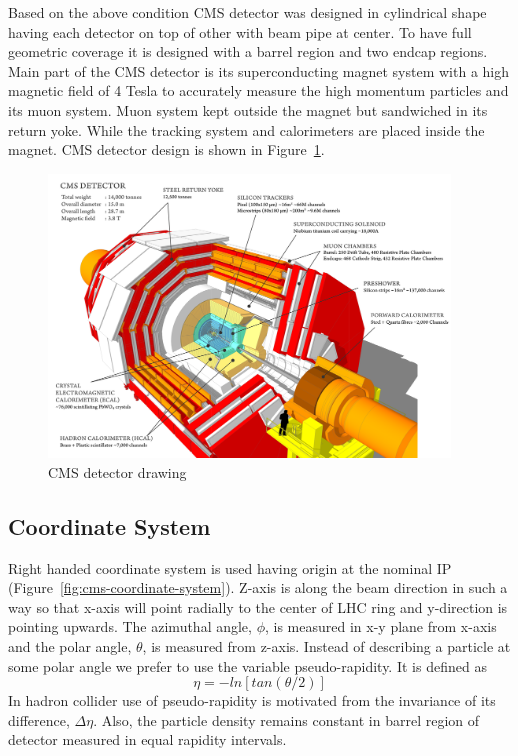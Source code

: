 Based on the above condition CMS detector was designed in cylindrical shape having each detector on top of other with beam pipe at center. To have full geometric coverage it is designed with a barrel region and two endcap regions. Main part of the CMS detector is its superconducting magnet system with a high magnetic field of 4 Tesla to accurately measure the high momentum particles and its muon system. Muon system kept outside the magnet but sandwiched in its return yoke. While the tracking system and calorimeters are placed inside the magnet. CMS detector design is shown in Figure~\ref{fig:CMS-detector}.
\begin{figure}[!htbp]
	\centering
	\includegraphics[width=0.95\textwidth]{figures/LHC/cms_120918_03.png}
	\caption{CMS detector drawing}
	\label{fig:CMS-detector}
\end{figure}

\subsection{Coordinate System} %
\label{sub:coordinate_system}
Right handed coordinate system is used having origin at the nominal IP (Figure~\ref{fig:cms-coordinate-system}). Z-axis is along the beam direction in such a way so that x-axis will point radially to the center of LHC ring and y-direction is pointing upwards. The azimuthal angle, $\phi$, is measured in x-y plane from x-axis and the polar angle, $\theta$, is measured from z-axis. Instead of describing a particle at some polar angle we prefer to use the variable pseudo-rapidity. It is defined as 
\begin{equation}
	\eta = -ln[tan(\theta / 2)]
\end{equation}
In hadron collider use of pseudo-rapidity is motivated from the invariance of its difference, $\Delta \eta$. Also, the particle density remains constant in barrel region of detector measured in equal rapidity intervals.

